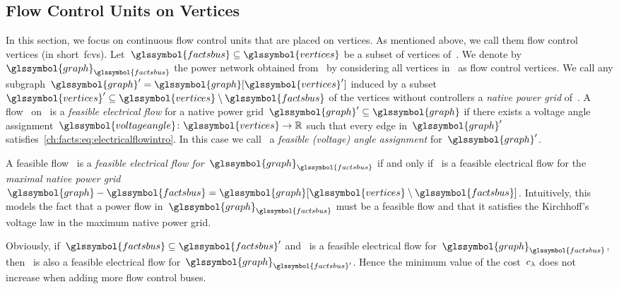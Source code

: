 \subsection{Flow Control Units on Vertices}%
\label{ch:facts:sec:flow-control-units-on-vertices}%
% 
In this section, we focus on continuous flow control units that are placed on
vertices. As mentioned above, we call them flow control vertices (in
short~\gls{fcv}s). Let~$\glssymbol{factsbus} \subseteq\glssymbol{vertices}$ be a
subset of vertices of~.  We denote
by~$\glssymbol{graph}_{\glssymbol{factsbus}}$ the power network obtained
from~ by considering all vertices in~ as
flow control vertices.  We call any subgraph~$
\glssymbol{graph}' 
=
\glssymbol{graph} [ \glssymbol{vertices}' ] $ induced by a
subset~$
\glssymbol{vertices}'
\subseteq
\glssymbol{vertices}
\setminus
\glssymbol{factsbus}$ of the vertices without controllers a \emph{native power
grid} of~.  A flow~ on~ is a
\emph{feasible electrical flow} for a native power
grid~$\glssymbol{graph}'\subseteq\glssymbol{graph}$ if there exists a voltage
angle assignment~$\glssymbol{voltageangle}\colon\glssymbol{vertices}\to\reals$
such that every edge in~$\glssymbol{graph}'$
satisfies~\cref{ch:facts:eq:electricalflowintro}. In this case we
call~ a \emph{feasible (voltage) angle assignment}
for~$\glssymbol{graph}'$.

A feasible flow~ is a \emph{feasible electrical flow
for~$\glssymbol{graph}_{\glssymbol{factsbus}}$} if and only if~
is a feasible electrical flow for the \emph{maximal native power grid}~$
\glssymbol{graph}
-
\glssymbol{factsbus} 
=
\glssymbol{graph} 
[ 
\glssymbol{vertices}
\setminus
\glssymbol{factsbus} 
] 
$. Intuitively, this models the fact that a power flow
in~$\glssymbol{graph}_{\glssymbol{factsbus}}$ must be a feasible flow and that
it satisfies the Kirchhoff's voltage law in the maximum native power grid.

Obviously, if~$\glssymbol{factsbus}\subseteq\glssymbol{factsbus}'$
and~ is a feasible electrical flow
for~$\glssymbol{graph}_{\glssymbol{factsbus}}$, then~ is also a
feasible electrical flow for~$\glssymbol{graph}_{\glssymbol{factsbus}'}$. Hence
the minimum value of the cost~$c_\lambda$ does not increase when adding
more flow control buses.

